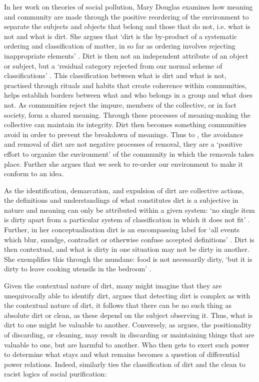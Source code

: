 In her work on theories of social pollution, Mary Douglas \citeyear{Douglas:1966} examines how meaning and community are made through the positive reordering of the environment to separate the subjects and objects that belong and those that do not, i.e.
what is not and what is dirt.
She argues that `dirt is the by-product of a systematic ordering and classification of matter, in so far as ordering involves rejecting inappropriate elements' \citep{Douglas:1966}.
Dirt is then not an independent attribute of an object or subject, but a `residual category rejected from our normal scheme of classifications' \citep{Douglas:1966}.
This classification between what is dirt and what is not, practised through rituals and habits that create coherence within communities, helps establish borders between what and who belongs in a group and what does not.
As communities reject the impure, members of the collective, or in fact society, form a shared meaning.
Through these processes of meaning-making the collective can maintain its integrity.
Dirt then becomes something communities avoid in order to prevent the breakdown of meanings.
Thus to \citet{Douglas:1966}, the avoidance and removal of dirt are not negative processes of removal, they are a `positive effort to organize the environment' \citep{Douglas:1966} of the community in which the removals takes place.
Further she argues that we seek to re-order our environment to make it conform to an idea.

As the identification, demarcation, and expulsion of dirt are collective actions, the definitions and understandings of what constitutes dirt is a subjective in nature and meaning can only be attributed within a given system: `no single item is dirty apart from a particular system of classification in which it does not fit' \citep{Douglas:1966}.
Further, in her conceptualisation dirt is an encompassing label for `all events which blur, smudge, contradict or otherwise confuse accepted definitions' \citep{Douglas:1966}.
Dirt is then contextual, and what is dirty in one situation may not be dirty in another.
She exemplifies this through the mundane: food is not necessarily dirty, `but it is dirty to leave cooking utensils in the bedroom' \citep{Douglas:1966}.

Given the contextual nature of dirt, many might imagine that they are unequivocally able to identify dirt, \citet{Douglas:1966} argues that detecting dirt is complex as with the contextual nature of dirt, it follows that there can be no such thing as absolute dirt or clean, as these depend on the subject observing it.
Thus, what is dirt to one might be valuable to another.
Conversely, as \citet{Lepawsky:2019} argues, the positionality of discarding, or cleaning, may result in discarding or maintaining things that are valuable to one, but are harmful to another.
Who then gets to exert such power to determine what stays and what remains becomes a question of differential power relations.
Indeed, \citet{Hall:1997} similarly ties the classification of dirt and the clean to racist logics of social purification:

